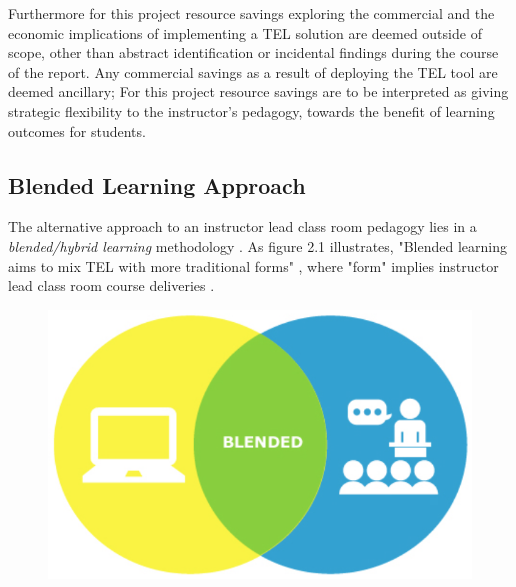 Furthermore for this project resource savings exploring the commercial and the economic implications of implementing a TEL solution are deemed outside of scope, other than  abstract identification or incidental findings during the course of the report. Any commercial savings as a result of deploying the TEL tool are  deemed ancillary; For this project resource savings are to be interpreted as giving strategic flexibility to the instructor's pedagogy, towards the benefit of learning outcomes for students.



\label{sec:sec01}
\subsection{Blended Learning Approach}
\label{definingBlendedLearning}

The alternative approach to an instructor lead class room pedagogy lies in a \textit{blended/hybrid learning} methodology \cite{Means2009,RickReis,Gordon2014}. As figure 2.1 illustrates, "Blended learning aims to mix TEL with more traditional forms" \cite{Gordon2014}, where "form" implies instructor lead class room course deliveries \cite{RickReis,Means2009}.

\begin{figure}[H]
	\centering
	\includegraphics[height=0.35\textheight]{figures/blendedLearning}
	\label{fig:Blended Learning}
\end{figure}

